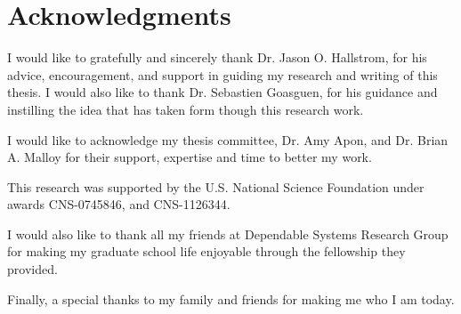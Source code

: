 \chapter*{Acknowledgments}



I would like to gratefully and sincerely thank Dr. Jason O. Hallstrom, for his advice, encouragement, and support in guiding my research and writing of this thesis. I would also like to thank Dr. Sebastien Goasguen, for his guidance and instilling the idea that has taken form though this research work.

I would like to acknowledge my thesis committee, Dr. Amy Apon, and Dr. Brian A. Malloy for their support, expertise and time to better my work.

This research was supported by the U.S. National Science Foundation under awards CNS-0745846, and CNS-1126344. 

I would also like to thank all my friends at Dependable Systems Research Group for making my graduate school life enjoyable through the fellowship they provided. 

Finally, a special thanks to my family and friends for making me who I am today.

